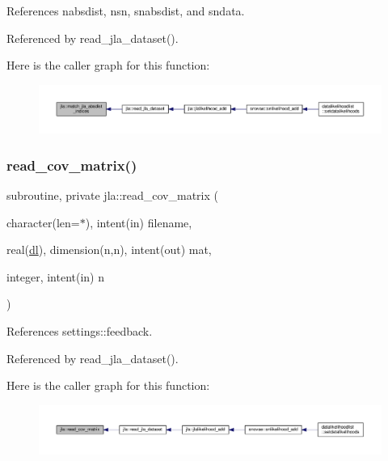 References nabsdist, nsn, snabsdist, and sndata.



Referenced by read\+\_\+jla\+\_\+dataset().

Here is the caller graph for this function\+:
\nopagebreak
\begin{figure}[H]
\begin{center}
\leavevmode
\includegraphics[width=350pt]{namespacejla_af2e3afa13e8cf5731d6cf06c1ddaf31a_icgraph}
\end{center}
\end{figure}
\mbox{\label{namespacejla_ae2ea921f1a8597682a71a793dc11bbe7}} 
\subsubsection{\texorpdfstring{read\+\_\+cov\+\_\+matrix()}{read\_cov\_matrix()}}
{\footnotesize\ttfamily subroutine, private jla\+::read\+\_\+cov\+\_\+matrix (\begin{DoxyParamCaption}\item[{character(len=$\ast$), intent(in)}]{filename,  }\item[{real(\mbox{\hyperlink{namespacejla_a3aa6435b4e08f1d532390186ac608741}{dl}}), dimension(n,n), intent(out)}]{mat,  }\item[{integer, intent(in)}]{n }\end{DoxyParamCaption})\hspace{0.3cm}{\ttfamily [private]}}



References settings\+::feedback.



Referenced by read\+\_\+jla\+\_\+dataset().

Here is the caller graph for this function\+:
\nopagebreak
\begin{figure}[H]
\begin{center}
\leavevmode
\includegraphics[width=350pt]{namespacejla_ae2ea921f1a8597682a71a793dc11bbe7_icgraph}
\end{center}
\end{figure}
\mbox{\label{namespacejla_ad1ad5e96f9f9f225249edadd8b348012}} 
